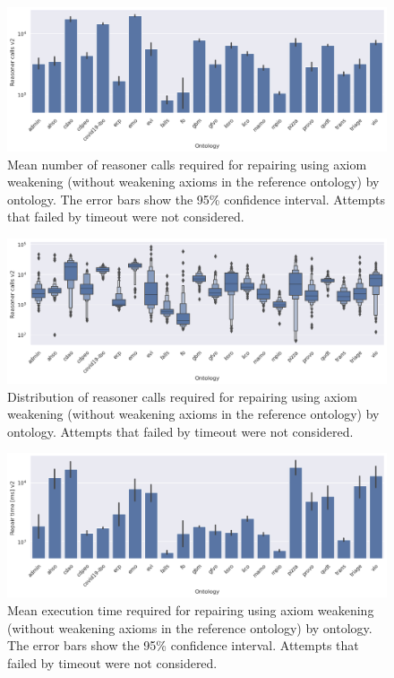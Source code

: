 \begin{figure}[ht]
  \centering
  \includegraphics[width=\textwidth]{resources/calls-enhance-ontology-bar.png}
  \caption{Mean number of reasoner calls required for repairing using axiom weakening (without weakening axioms in the reference ontology) by ontology. The error bars show the 95\% confidence interval. Attempts that failed by timeout were not considered.}
\end{figure}

\begin{figure}[ht]
  \centering
  \includegraphics[width=\textwidth]{resources/calls-enhance-ontology-violin.png}
  \caption{Distribution of reasoner calls required for repairing using axiom weakening (without weakening axioms in the reference ontology) by ontology. Attempts that failed by timeout were not considered.}
\end{figure}

\begin{figure}[ht]
  \centering
  \includegraphics[width=\textwidth]{resources/time-enhance-ontology-bar.png}
  \caption{Mean execution time required for repairing using axiom weakening (without weakening axioms in the reference ontology) by ontology. The error bars show the 95\% confidence interval. Attempts that failed by timeout were not considered.}
\end{figure}

